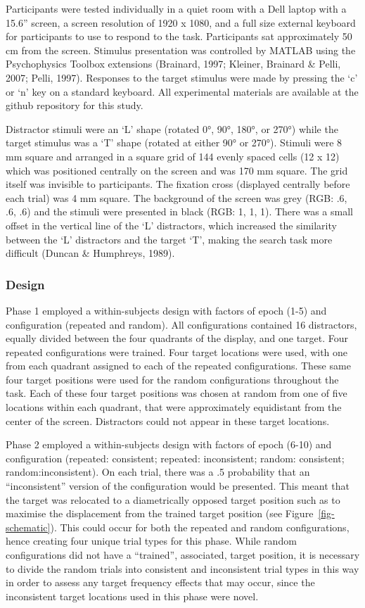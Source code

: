\documentclass[
  man,
  floatsintext,
  longtable,
  nolmodern,
  notxfonts,
  notimes,
  colorlinks=true,linkcolor=blue,citecolor=blue,urlcolor=blue]{apa7}
\begin{document}
Participants were tested individually in a quiet room with a Dell laptop
with a 15.6'' screen, a screen resolution of 1920 x 1080, and a full
size external keyboard for participants to use to respond to the task.
Participants sat approximately 50 cm from the screen. Stimulus
presentation was controlled by MATLAB using the Psychophysics Toolbox
extensions (Brainard, 1997; Kleiner, Brainard \& Pelli, 2007; Pelli,
1997). Responses to the target stimulus were made by pressing the `c' or
`n' key on a standard keyboard. All experimental materials are available
at the github repository for this study.

Distractor stimuli were an `L' shape (rotated 0°, 90°, 180°, or 270°)
while the target stimulus was a `T' shape (rotated at either 90° or
270°). Stimuli were 8 mm square and arranged in a square grid of 144
evenly spaced cells (12 x 12) which was positioned centrally on the
screen and was 170 mm square. The grid itself was invisible to
participants. The fixation cross (displayed centrally before each trial)
was 4 mm square. The background of the screen was grey (RGB: .6, .6, .6)
and the stimuli were presented in black (RGB: 1, 1, 1). There was a
small offset in the vertical line of the `L' distractors, which
increased the similarity between the `L' distractors and the target `T',
making the search task more difficult (Duncan \& Humphreys, 1989).

\subsubsection{Design}\label{design}

Phase 1 employed a within-subjects design with factors of epoch (1-5)
and configuration (repeated and random). All configurations contained 16
distractors, equally divided between the four quadrants of the display,
and one target. Four repeated configurations were trained. Four target
locations were used, with one from each quadrant assigned to each of the
repeated configurations. These same four target positions were used for
the random configurations throughout the task. Each of these four target
positions was chosen at random from one of five locations within each
quadrant, that were approximately equidistant from the center of the
screen. Distractors could not appear in these target locations.

Phase 2 employed a within-subjects design with factors of epoch (6-10)
and configuration (repeated: consistent; repeated: inconsistent; random:
consistent; random:inconsistent). On each trial, there was a .5
probability that an ``inconsistent'' version of the configuration would
be presented. This meant that the target was relocated to a
diametrically opposed target position such as to maximise the
displacement from the trained target position (see
Figure~\ref{fig-schematic}). This could occur for both the repeated and
random configurations, hence creating four unique trial types for this
phase. While random configurations did not have a ``trained'',
associated, target position, it is necessary to divide the random trials
into consistent and inconsistent trial types in this way in order to
assess any target frequency effects that may occur, since the
inconsistent target locations used in this phase were novel.
\end{document}
